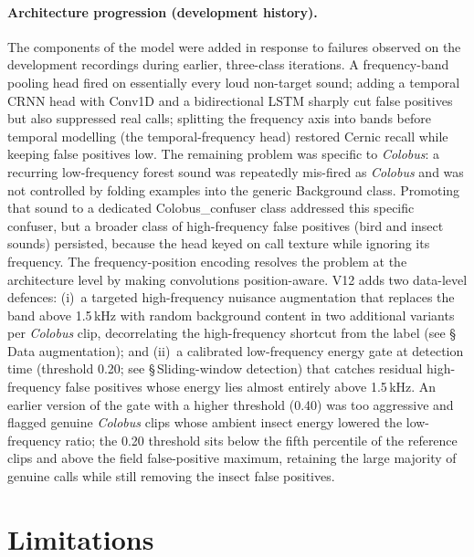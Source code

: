 \documentclass[final,3p,times]{elsarticle}
\begin{document}
\paragraph{Architecture progression (development history).}
The components of the model were added in response to failures observed on the
development recordings during earlier, three-class iterations. A
frequency-band pooling head fired on essentially every loud non-target
sound; adding a temporal CRNN head with Conv1D and a bidirectional LSTM
sharply cut false positives but also suppressed real calls; splitting the
frequency axis into bands before temporal modelling (the temporal-frequency
head) restored Cernic recall while keeping false positives low. The
remaining problem was specific to \textit{Colobus}: a recurring low-frequency
forest sound was repeatedly mis-fired as \textit{Colobus} and was not
controlled by folding examples into the generic Background class. Promoting that
sound to a dedicated Colobus\_confuser class addressed this
specific confuser, but a broader class of high-frequency false positives
(bird and insect sounds) persisted, because the head keyed on call texture
while ignoring its frequency. The frequency-position encoding resolves
the problem at the architecture level by making convolutions position-aware.
V12 adds two data-level defences: (i)~a targeted high-frequency nuisance
augmentation that replaces the band above 1.5\,kHz with random background
content in two additional variants per \textit{Colobus} clip, decorrelating the
high-frequency shortcut from the label (see \S\,Data augmentation); and (ii)~a
calibrated low-frequency energy gate at detection time (threshold 0.20;
see \S\,Sliding-window detection) that catches residual high-frequency false
positives whose energy lies almost entirely above 1.5\,kHz. An earlier version
of the gate with a higher threshold (0.40) was too aggressive and flagged
genuine \textit{Colobus} clips whose ambient insect energy lowered the
low-frequency ratio; the 0.20 threshold sits below the fifth percentile of the
reference clips and above the field false-positive maximum, retaining the large
majority of genuine calls while still removing the insect false positives.

\section*{Limitations}
\end{document}

